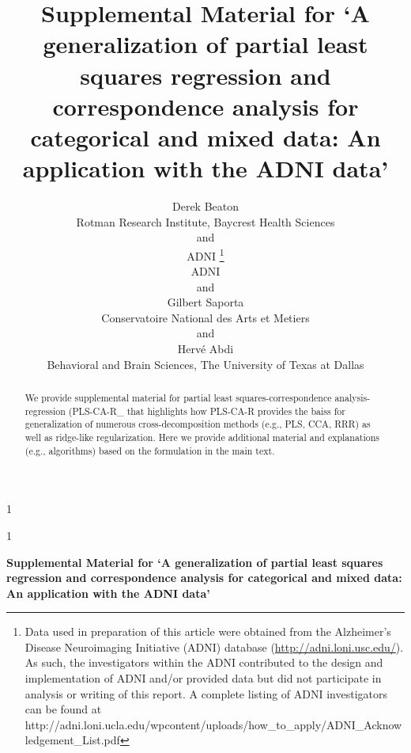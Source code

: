 \documentclass[12pt]{article}
\newcommand{\blind}{1}
\begin{document}
\def\spacingset#1{\renewcommand{\baselinestretch}%
{#1}\small\normalsize} \spacingset{1}



\blind
{
  \title{\bf Supplemental Material for `A generalization of partial least squares
regression and correspondence analysis for categorical and mixed data:
An application with the ADNI data'}

  \author{
        Derek Beaton \\
    Rotman Research Institute, Baycrest Health Sciences\\
     and \\     ADNI \thanks{Data used in preparation of this article were obtained from the
Alzheimer's Disease Neuroimaging Initiative (ADNI) database
(\url{http://adni.loni.usc.edu/}). As such, the investigators within the
ADNI contributed to the design and implementation of ADNI and/or
provided data but did not participate in analysis or writing of this
report. A complete listing of ADNI investigators can be found at
http://adni.loni.ucla.edu/wpcontent/uploads/how\_to\_apply/ADNI\_Acknowledgement\_List.pdf} \\
    ADNI\\
     and \\     Gilbert Saporta \\
    Conservatoire National des Arts et Metiers\\
     and \\     Hervé Abdi \\
    Behavioral and Brain Sciences, The University of Texas at Dallas\\
      }
  \maketitle
} \fi

\blind
{
  \bigskip
  \bigskip
  \bigskip
  \begin{center}
    {\LARGE\bf Supplemental Material for `A generalization of partial least squares
regression and correspondence analysis for categorical and mixed data:
An application with the ADNI data'}
  \end{center}
  \medskip
} \fi

\bigskip
\begin{abstract}
We provide supplemental material for partial least
squares-correspondence analysis-regression (PLS-CA-R\_ that highlights
how PLS-CA-R provides the baiss for generalization of numerous
cross-decomposition methods (e.g., PLS, CCA, RRR) as well as ridge-like
regularization. Here we provide additional material and explanations
(e.g., algorithms) based on the formulation in the main text.
\end{abstract}
\end{document}
